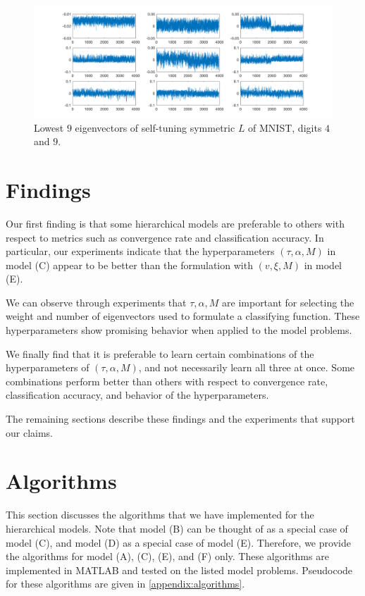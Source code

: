 \documentclass{siamart1116}
\begin{document}
            \begin{figure}[!htb]
            \centering
            \caption{\label{fig:mnist_spec} Lowest $9$ eigenvectors of self-tuning symmetric $L$ of MNIST, digits $4$ and $9$.}
            \includegraphics[width=0.5\linewidth]{laplacians/mnist_laplacian.png}
            \end{figure}

\section{Findings}
    Our first finding is that some hierarchical models are preferable to others with respect to metrics such as convergence rate and classification accuracy. In particular, our experiments indicate that the hyperparameters $(\tau, \alpha, M)$ in model (C) appear to be better than the formulation with $(v, \xi, M)$ in model (E).

    We can observe through experiments that $\tau, \alpha, M$ are important for selecting the weight and number of eigenvectors used to formulate a classifying function. These hyperparameters show promising behavior when applied to the model problems.

    We finally find that it is preferable to learn certain combinations of the hyperparameters of $(\tau, \alpha, M)$, and not necessarily learn all three at once. Some combinations perform better than others with respect to convergence rate, classification accuracy, and behavior of the hyperparameters.

    The remaining sections describe these findings and the experiments that support our claims.

\section{Algorithms}
    This section discusses the algorithms that we have implemented for the hierarchical models. Note that model (B) can be thought of as a special case of model (C), and model (D) as a special case of model (E). Therefore, we provide the algorithms for model (A), (C), (E), and (F) only. These algorithms are implemented in MATLAB and tested on the listed model problems. Pseudocode for these algorithms are given in \cref{appendix:algorithms}.
\end{document}
